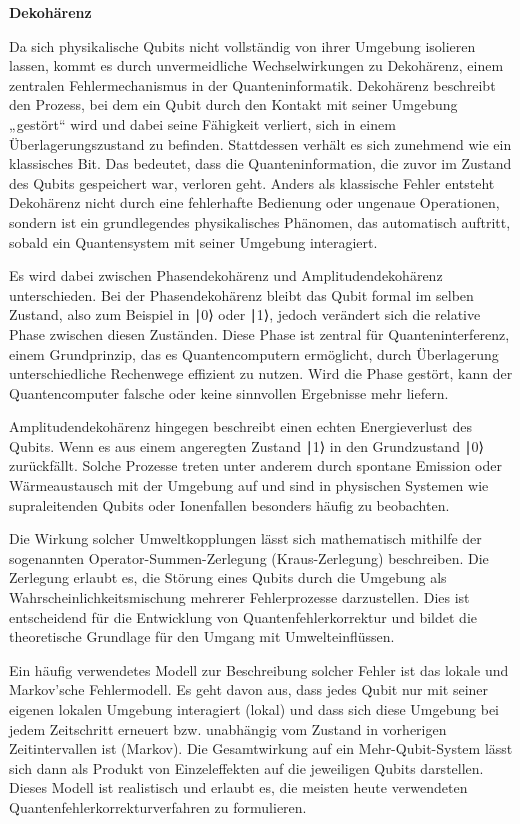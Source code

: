 \textbf{Dekohärenz}

Da sich physikalische Qubits nicht vollständig von ihrer Umgebung isolieren lassen, kommt es durch unvermeidliche Wechselwirkungen zu Dekohärenz, einem zentralen Fehlermechanismus in der Quanteninformatik.
Dekohärenz beschreibt den Prozess, bei dem ein Qubit durch den Kontakt mit seiner Umgebung „gestört“ wird und dabei seine Fähigkeit verliert, sich in einem Überlagerungszustand zu befinden. Stattdessen verhält es sich zunehmend wie ein klassisches Bit. Das bedeutet, dass die Quanteninformation, die zuvor im Zustand des Qubits gespeichert war, verloren geht. Anders als klassische Fehler entsteht Dekohärenz nicht durch eine fehlerhafte Bedienung oder ungenaue Operationen, sondern ist ein grundlegendes physikalisches Phänomen, das automatisch auftritt, sobald ein Quantensystem mit seiner Umgebung interagiert.

Es wird dabei zwischen Phasendekohärenz und Amplitudendekohärenz unterschieden. Bei der Phasendekohärenz bleibt das Qubit formal im selben Zustand, also zum Beispiel in ∣0⟩ oder ∣1⟩, jedoch verändert sich die relative Phase zwischen diesen Zuständen. Diese Phase ist zentral für Quanteninterferenz, einem Grundprinzip, das es Quantencomputern ermöglicht, durch Überlagerung unterschiedliche Rechenwege effizient zu nutzen. Wird die Phase gestört, kann der Quantencomputer falsche oder keine sinnvollen Ergebnisse mehr liefern. 

Amplitudendekohärenz hingegen beschreibt einen echten Energieverlust des Qubits. Wenn es aus einem angeregten Zustand ∣1⟩ in den Grundzustand ∣0⟩ zurückfällt. Solche Prozesse treten unter anderem durch spontane Emission oder Wärmeaustausch mit der Umgebung auf und sind in physischen Systemen wie supraleitenden Qubits oder Ionenfallen besonders häufig zu beobachten.

Die Wirkung solcher Umweltkopplungen lässt sich mathematisch mithilfe der sogenannten Operator-Summen-Zerlegung (Kraus-Zerlegung) beschreiben. Die Zerlegung erlaubt es, die Störung eines Qubits durch die Umgebung als Wahrscheinlichkeitsmischung mehrerer Fehlerprozesse darzustellen. Dies ist entscheidend für die Entwicklung von Quantenfehlerkorrektur und bildet die theoretische Grundlage für den Umgang mit Umwelteinflüssen.

Ein häufig verwendetes Modell zur Beschreibung solcher Fehler ist das lokale und Markov’sche Fehlermodell. Es geht davon aus, dass jedes Qubit nur mit seiner eigenen lokalen Umgebung interagiert (lokal) und dass sich diese Umgebung bei jedem Zeitschritt erneuert bzw. unabhängig vom Zustand in vorherigen Zeitintervallen ist (Markov). Die Gesamtwirkung auf ein Mehr-Qubit-System lässt sich dann als Produkt von Einzeleffekten auf die jeweiligen Qubits darstellen. Dieses Modell ist realistisch und erlaubt es, die meisten heute verwendeten Quantenfehlerkorrekturverfahren zu formulieren. 

